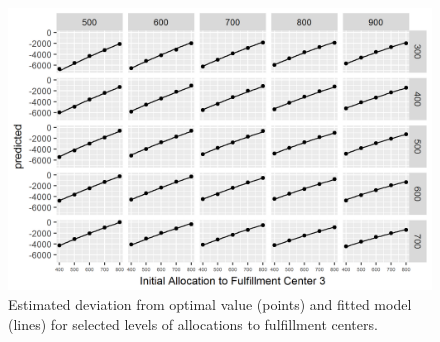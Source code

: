 \documentclass[11pt, oneside]{article}   	%
\begin{document}
\begin{figure}
\centering
\includegraphics{model-fit-broad}
\caption{Estimated deviation from optimal value (points) and fitted model (lines) for selected levels of allocations to fulfillment centers.}  \label{fi:modelbroad}
\end{figure}
\end{document}
